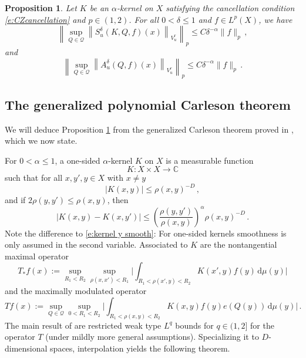 \documentclass[12pt,reqno,a4paper,dvipsnames]{amsart}
\theoremstyle{plain}
\newtheorem{prop}[theorem]{Proposition}
\theoremstyle{definition}
\numberwithin{theorem}{section}
\numberwithin{equation}{section}
\newcommand{\AD}{D}
\begin{document}
\begin{prop}
    \label{p:SmoTrun}
    Let $K$ be an $\alpha$-kernel on $X$ satisfying the cancellation condition \eqref{e:CZcancellation} and $p \in (1,2)$. For all $0 < \delta \le  1$ and $f \in L^p(X)$, we have
    \begin{equation}
        \label{e:SmoTrun1}
        \left\|\sup_{Q \in \mathcal{Q}} \left\| S^{\delta}_{u}(K, Q, f)(x)\right\|_{V^r_u}\right\|_p
        \leq C \delta^{-\alpha} \|f\|_p\,,
    \end{equation}
    and
    \begin{equation}
        \label{e:SmoTrun2}
        \left\|\sup_{Q \in \mathcal{Q}} \left\| A_u^\delta(Q, f)(x) \right\|_{V^r_u}\right\|_p
        \leq C \delta^{-\alpha} \|f\|_p\,.
    \end{equation}
\end{prop}

\subsection{The generalized polynomial Carleson theorem}

    We will deduce Proposition \ref{p:SmoTrun} from the generalized Carleson theorem proved in \cite{beckeretal}, which we now state. 
    
    For $0<\alpha\leq 1$, a one-sided $\alpha$-kernel $K$ on $X$ is a measurable function
    \begin{equation*}
        K \colon X \times X \to \mathbb{C}
    \end{equation*}
    such that for all $x, y', y \in X$ with $x \neq y$
    \begin{equation}\label{e:1skernel size}
        |K(x,y)| \le \rho(x,y)^{-\AD}\,,
    \end{equation}
    and if $2\rho(y,y') \le \rho(x,y)$, then
    \begin{equation}\label{e:1skernel y smooth}
        |K(x,y) - K(x,y')|
        \le
        \left(\frac{\rho(y,y')}{\rho(x,y)}\right)^{\alpha}
        \rho(x,y)^{-\AD}\,.
    \end{equation}
    Note the difference to \eqref{e:kernel y smooth}: For one-sided kernels smoothness is only assumed in the second variable.
    Associated to $K$ are the nontangential maximal operator
    \begin{equation}\label{e:def tang unm op}
        T_{*}f(x)
        := \sup_{R_1 < R_2} \sup_{\rho(x,x') < R_1}
        \Big| \int_{R_1 < \rho(x',y) < R_2}
        K(x',y) f(y) \, \mathrm{d}\mu(y) \Big|
    \end{equation}
    and the maximally modulated operator
    \begin{equation}\label{e:def main op}
        Tf(x)
        := \sup_{Q \in \mathcal{Q}} \sup_{0 < R_1 < R_2}
        \Big| \int_{R_1 < \rho(x,y) < R_2}
        K(x,y) f(y) e(Q(y)) \, \mathrm{d}\mu(y) \Big|\,.
    \end{equation}
    The main result of \cite{beckeretal} are restricted weak type $L^q$ bounds for $q \in (1,2]$ for the operator $T$ (under mildly more general assumptions). Specializing it to $\AD$-dimensional spaces, interpolation yields the following theorem. 
\end{document}
